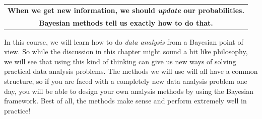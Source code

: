 \begin{center}
\begin{tabular}{|c|}
\hline
{\bf When we get new information, we should {\it update} our probabilities.}\\
{\bf Bayesian methods tell us exactly how to do that.}\\
\hline
\end{tabular}
\end{center}

In this course, we will learn how to do {\it data analysis} from a Bayesian
point of view. So while the discussion in this chapter might sound a bit
like philosophy, we will see that using this kind of thinking can give us
new ways of solving practical data analysis problems. The methods we will use
will all have a common structure, so if you are faced with a completely new
data analysis problem one day, you will be able to design your own analysis
methods by using the Bayesian framework. Best of all, the methods make sense
and perform extremely well in practice!




